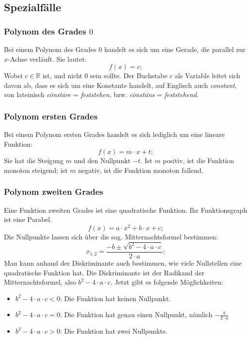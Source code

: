 \documentclass[a4paper]{article}
\begin{document}
\subsection{Spezialf\"alle}

\subsubsection{Polynom des Grades $0$}
Bei einem Polynom des Grades $0$ handelt es sich um eine Gerade,
die parallel zur $x$-Achse verl\"auft.
Sie lautet:
\[
	f(x) = c ;
\]
Wobei $c \in \mathbb{R} $ ist,
und nicht $0$ sein sollte.
Der Buchstabe $c$ als Variable leitet sich davon ab,
dass es sich um eine Konstante handelt,
auf Englisch auch \textit{constant},
von lateinisch \textit{c\=onst\=are} = \textit{feststehen},
bzw. \textit{c\=onst\=ans} = \textit{feststehend}.

\subsubsection{Polynom ersten Grades}
Bei einem Polynom ersten Grades handelt es sich lediglich um eine lineare Funktion:
\[
f(x) = m \cdot x + t ;
\]
Sie hat die Steigung $m$ und den Nullpunkt $ -t $.
Ist $m$ positiv,
ist die Funktion monoton steigend;
ist $m$ negativ,
ist die Funktion monoton fallend.

\subsubsection{Polynom zweiten Grades}
Eine Funktion zweiten Grades ist eine quadratische Funktion.
Ihr Funktionsgraph ist eine Parabel.
\[
	f(x) = a \cdot x^2 + b \cdot x + c ;
\]
Die Nullpunkte lassen sich \"uber die sog. Mitternachtsformel bestimmen:
\[
	x_{1,2} = \frac{-b \pm \sqrt{b^2 - 4 \cdot a \cdot c}}{2 \cdot a} ;
\]
Man kann anhand der Diskriminante auch bestimmen,
wie viele Nullstellen eine quadratische Funktion hat.
Die Diskriminante ist der Radikand der Mitternachtsformel,
also $ b^2 - 4 \cdot a \cdot c $.
Jetzt gibt es folgende M\"oglichkeiten:
\begin{itemize}[nosep]
	\item $ b^2 - 4 \cdot a \cdot c < 0 $: Die Funktion hat keinen Nullpunkt.
	\item $ b^2 - 4 \cdot a \cdot c = 0 $: Die Funktion hat genau einen Nullpunkt, n\"amlich $ -\frac{b}{2 \cdot a} $
	\item $ b^2 - 4 \cdot a \cdot c > 0 $: Die Funktion hat zwei Nullpunkte.
\end{itemize}
\end{document}
